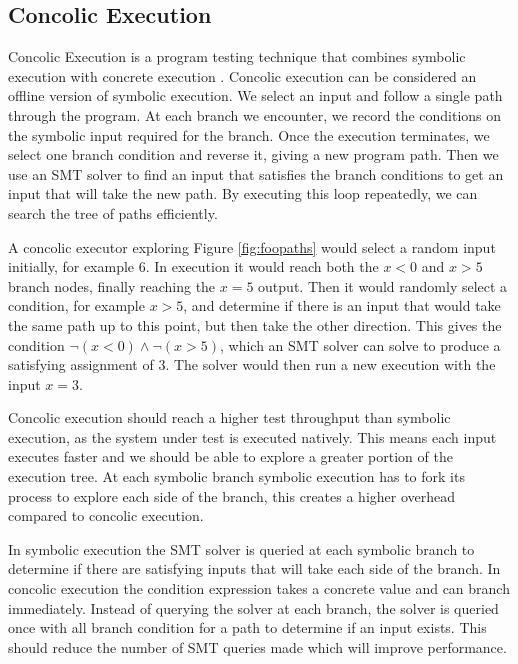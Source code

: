 \documentclass[12pt,twoside]{report}
\begin{document}

\subsection{Concolic Execution}
Concolic Execution is a program testing technique that combines symbolic execution with concrete execution \cite{217563}.
Concolic execution can be considered an offline version of symbolic execution. We select an input and follow a single path through the program. At each branch we encounter, we record the conditions on the symbolic input required for the branch. Once the execution terminates, we select one branch condition and reverse it, giving a new program path. Then we use an SMT solver to find an input that satisfies the branch conditions to get an input that will take the new path. By executing this loop repeatedly, we can search the tree of paths efficiently.

A concolic executor exploring Figure \ref{fig:foopaths} would select a random input initially, for example 6. In execution it would reach both the $x < 0$ and $x > 5$ branch nodes, finally reaching the $x = 5$ output. Then it would randomly select a condition, for example $x > 5$, and determine if there is an input that would take the same path up to this point, but then take the other direction. This gives the condition $\neg(x < 0) \wedge \neg(x > 5)$, which an SMT solver can solve to produce a satisfying assignment of $3$. The solver would then run a new execution with the input $x = 3$.

Concolic execution should reach a higher test throughput than symbolic execution, as the system under test is executed natively. This means each input executes faster and we should be able to explore a greater portion of the execution tree. At each symbolic branch symbolic execution has to fork its process to explore each side of the branch, this creates a higher overhead compared to concolic execution.

In symbolic execution the SMT solver is queried at each symbolic branch to determine if there are satisfying inputs that will take each side of the branch. In concolic execution the condition expression takes a concrete value and can branch immediately. Instead of querying the solver at each branch, the solver is queried once with all branch condition for a path to determine if an input exists. This should reduce the number of SMT queries made which will improve performance.
\end{document}
